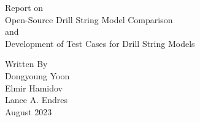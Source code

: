 \hypersetup{pageanchor=false}

\begin{titlepage}
\thispagestyle{ledateinfooter}
\bfseries

\begin{center}

\Large Report on\\
\LARGE Open-Source Drill String Model Comparison\\
\Large and\\
\LARGE Development of Test Cases for Drill String Models


\vfill

\large Written By\\
\Large Dongyoung Yoon\\
\Large Elmir Hamidov\\
\Large Lance A. Endres\\
\vspace*{2pt}
\large August 2023

%
\end{center}

\normalsize
\end{titlepage}

\hypersetup{pageanchor=true} 